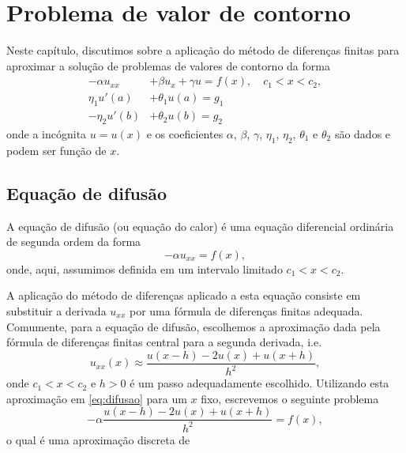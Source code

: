 
\chapter{Problema de valor de contorno}\label{cap_pvc}
\thispagestyle{fancy}

Neste capítulo, discutimos sobre a aplicação do método de diferenças finitas para aproximar a solução de problemas de valores de contorno da forma
\begin{align}
  -\alpha u_{xx} &+ \beta u_{x} + \gamma u = f(x),\quad c_1 < x < c_2,\\
  \eta_1 u'(a) &+ \theta_1 u(a) = g_1\\
  -\eta_2 u'(b) &+ \theta_2 u(b) = g_2
\end{align}
onde a incógnita $u = u(x)$ e os coeficientes $\alpha$, $\beta$, $\gamma$, $\eta_1$, $\eta_2$, $\theta_1$ e $\theta_2$ são dados e podem ser função de $x$.

\section{Equação de difusão}

A equação de difusão (ou equação do calor) é uma equação diferencial ordinária de segunda ordem da forma
\begin{equation}\label{eq:diffusao}
  -\alpha u_{xx} = f(x),
\end{equation}
onde, aqui, assumimos definida em um intervalo limitado $c_1 < x < c_2$.

A aplicação do método de diferenças aplicado a esta equação consiste em substituir a derivada $u_{xx}$ por uma fórmula de diferenças finitas adequada. Comumente, para a equação de difusão, escolhemos a aproximação dada pela fórmula de diferenças finitas central para a segunda derivada, i.e.
\begin{equation}
  u_{xx}(x) \approx \frac{u(x-h)-2u(x)+u(x+h)}{h^2},
\end{equation}
onde $c_1 < x < c_2$ e $h>0$ é um passo adequadamente escolhido. Utilizando esta aproximação em \eqref{eq:difusao} para um $x$ fixo, escrevemos o seguinte problema
\begin{equation}
  -\alpha \frac{u(x-h)-2u(x)+u(x+h)}{h^2} = f(x),
\end{equation}
o qual é uma aproximação discreta de \label{eq:difusao} 


\emconstrucao
